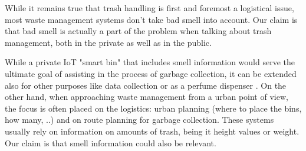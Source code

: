While it remains true that trash handling is first and foremost a logistical issue, most waste management systems don't take bad smell into account.
Our claim is that bad smell is actually a part of the problem when talking about trash management,  both in the private as well as in the public.

While a private IoT "smart bin" that includes smell information would serve the ultimate goal of assisting in the process of garbage collection, it can be extended also for other purposes like data collection or as a perfume dispenser \cite{perfume}.
On the other hand, when approaching waste management from a urban point of view, the focus is often placed on the logistics: urban planning (where to place the bins, how many, ..) and on route planning for garbage collection.
These systems usually rely on information on amounts of trash, being it height values or weight.
Our claim  is that smell information could also be relevant.
\fi